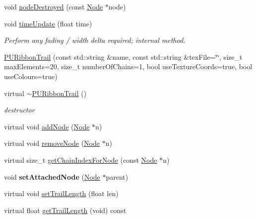 \begin{DoxyCompactItemize}
void \hyperlink{classPURibbonTrail_a2330a097fe804b197556eff5bce345ec}{node\+Destroyed} (const \hyperlink{classNode}{Node} $\ast$node)
\item 
\mbox{\label{classPURibbonTrail_abf38ce5e5b57c0b3cf947439e78d500c}} 
void \hyperlink{classPURibbonTrail_abf38ce5e5b57c0b3cf947439e78d500c}{time\+Update} (float time)
\begin{DoxyCompactList}\small\item\em Perform any fading / width delta required; internal method. \end{DoxyCompactList}\item 
\hyperlink{classPURibbonTrail_ab7cd922100aa2ca7725a1f608b5d6c26}{P\+U\+Ribbon\+Trail} (const std\+::string \&name, const std\+::string \&tex\+File=\char`\"{}\char`\"{}, size\+\_\+t max\+Elements=20, size\+\_\+t number\+Of\+Chains=1, bool use\+Texture\+Coords=true, bool use\+Colours=true)
\item 
\mbox{\label{classPURibbonTrail_a91ff0bc5ee29538ff6f3641602c18a77}} 
virtual \hyperlink{classPURibbonTrail_a91ff0bc5ee29538ff6f3641602c18a77}{$\sim$\+P\+U\+Ribbon\+Trail} ()
\begin{DoxyCompactList}\small\item\em destructor \end{DoxyCompactList}\item 
virtual void \hyperlink{classPURibbonTrail_a1ffe32a409da10330b7200bc77e25b0d}{add\+Node} (\hyperlink{classNode}{Node} $\ast$n)
\item 
virtual void \hyperlink{classPURibbonTrail_a0c3fce3ad7a234a09915afd9a0f7a3b8}{remove\+Node} (\hyperlink{classNode}{Node} $\ast$n)
\item 
virtual size\+\_\+t \hyperlink{classPURibbonTrail_ab09933f2c4821065bfd81bac9566733d}{get\+Chain\+Index\+For\+Node} (const \hyperlink{classNode}{Node} $\ast$n)
\item 
\mbox{\label{classPURibbonTrail_a925a8af6ebe70c26a3d0b694ed04ce73}} 
void {\bfseries set\+Attached\+Node} (\hyperlink{classNode}{Node} $\ast$parent)
\item 
virtual void \hyperlink{classPURibbonTrail_a59f44fbda81a2323685745dd073348f8}{set\+Trail\+Length} (float len)
\item 
virtual float \hyperlink{classPURibbonTrail_a1c63f6dcfb5ac3dcd9fc0abb2098e074}{get\+Trail\+Length} (void) const

\end{DoxyCompactItemize}
